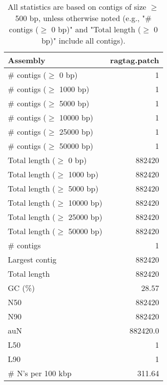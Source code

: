\documentclass[12pt,a4paper]{article}
\begin{document}
\begin{table}[ht]
\begin{center}
\caption{All statistics are based on contigs of size $\geq$ 500 bp, unless otherwise noted (e.g., "\# contigs ($\geq$ 0 bp)" and "Total length ($\geq$ 0 bp)" include all contigs).}
\begin{tabular}{|l*{1}{|r}|}
\hline
Assembly & ragtag.patch \\ \hline
\# contigs ($\geq$ 0 bp) & 1 \\ \hline
\# contigs ($\geq$ 1000 bp) & 1 \\ \hline
\# contigs ($\geq$ 5000 bp) & 1 \\ \hline
\# contigs ($\geq$ 10000 bp) & 1 \\ \hline
\# contigs ($\geq$ 25000 bp) & 1 \\ \hline
\# contigs ($\geq$ 50000 bp) & 1 \\ \hline
Total length ($\geq$ 0 bp) & 882420 \\ \hline
Total length ($\geq$ 1000 bp) & 882420 \\ \hline
Total length ($\geq$ 5000 bp) & 882420 \\ \hline
Total length ($\geq$ 10000 bp) & 882420 \\ \hline
Total length ($\geq$ 25000 bp) & 882420 \\ \hline
Total length ($\geq$ 50000 bp) & 882420 \\ \hline
\# contigs & 1 \\ \hline
Largest contig & 882420 \\ \hline
Total length & 882420 \\ \hline
GC (\%) & 28.57 \\ \hline
N50 & 882420 \\ \hline
N90 & 882420 \\ \hline
auN & 882420.0 \\ \hline
L50 & 1 \\ \hline
L90 & 1 \\ \hline
\# N's per 100 kbp & 311.64 \\ \hline
\end{tabular}
\end{center}
\end{table}
\end{document}
